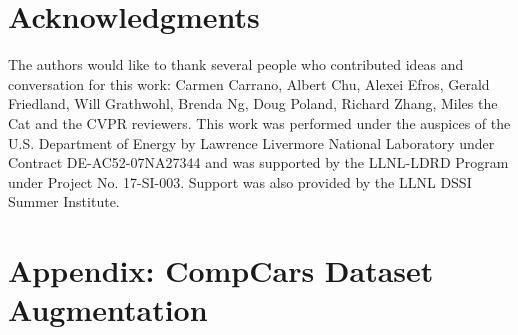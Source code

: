 \documentclass[10pt,twocolumn,letterpaper]{article}
\begin{document}
\section*{Acknowledgments}
The authors would like to thank several people who contributed ideas and conversation for this work: Carmen Carrano, Albert Chu, Alexei Efros, Gerald Friedland, Will Grathwohl, Brenda Ng, Doug Poland, Richard Zhang, Miles the Cat and the CVPR reviewers. This work was performed under the auspices of the U.S. Department of Energy by Lawrence Livermore National Laboratory under Contract DE-AC52-07NA27344 and was supported by the LLNL-LDRD Program under Project No. 17-SI-003. Support was also provided by the LLNL DSSI Summer Institute. 

{\small


}


\clearpage
\appendix
\section{Appendix: CompCars Dataset Augmentation} \label{compcars_appendix}
\end{document}
